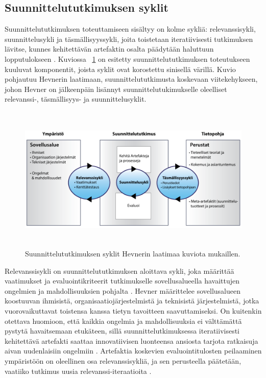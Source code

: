 \documentclass[utf8]{gradu3}
\begin{document}
%

\subsection{Suunnittelututkimuksen syklit}
\label{cycless} 

Suunnittelututkimuksen toteuttamiseen sisältyy on kolme sykliä: relevanssisykli, suunnittelusykli ja täsmällisyyssykli, joita toistetaan iteratiivisesti tutkimuksen lävitse, kunnes kehitettävän artefaktin osalta päädytään haluttuun lopputulokseen \parencite{cycles}. Kuviossa ~\ref{fig:dsr} on esitetty suunnittelututkimuksen toteutukseen kuuluvat komponentit, joista syklit ovat korostettu sinisellä värillä. Kuvio pohjautuu Hevnerin \parencite*{hevner2004} laatimaan, suunnittelututkimusta koskevaan viitekehykseen, johon Hevner \parencite*{cycles} on jälkeenpäin lisännyt suunnittelutukimukselle oleelliset relevanssi-, täsmällisyys- ja suunnittelusyklit.

\begin{figure}[h]\centering
  \includegraphics[height=7cm,keepaspectratio]{DSR}
  \caption{Suunnittelututkimuksen syklit Hevnerin \parencite*{cycles} laatimaa kuviota mukaillen. }
  \label{fig:dsr}
\end{figure}

Relevanssisykli on suunnittelututkimuksen aloittava sykli, joka määrittää vaatimukset ja evaluointikriteerit tutkimukselle sovellusalueella havaittujen ongelmien ja mahdollisuuksien pohjalta \parencite{cycles}. Hevner \parencite*{cycles} määrittelee sovellusalueen koostuuvan ihmisistä, organisaatiojärjestelmistä ja teknisistä järjestelmistä, jotka vuorovaikuttavat toistensa kanssa tietyn tavoitteen saavuttamiseksi. On kuitenkin otettava huomioon, että kaikkia ongelmia ja mahdollisuuksia ei välttämättä pystytä havaitsemaan etukäteen, sillä suunnittelutkimuksessa iteratiivisesti kehitettävä artefakti saattaa innovatiivisen luonteensa ansiosta tarjota ratkaisuja aivan uudenlaisiin ongelmiin \parencite{pragmatic}. Artefaktia koskevien evaluointitulosten peilaaminen ympäristöön on oleellinen osa relevanssisykliä, ja sen perusteella päätetään, vaatiiko tutkimus uusia relevanssi-iteraatioita \parencite{cycles}. 
\end{document}
